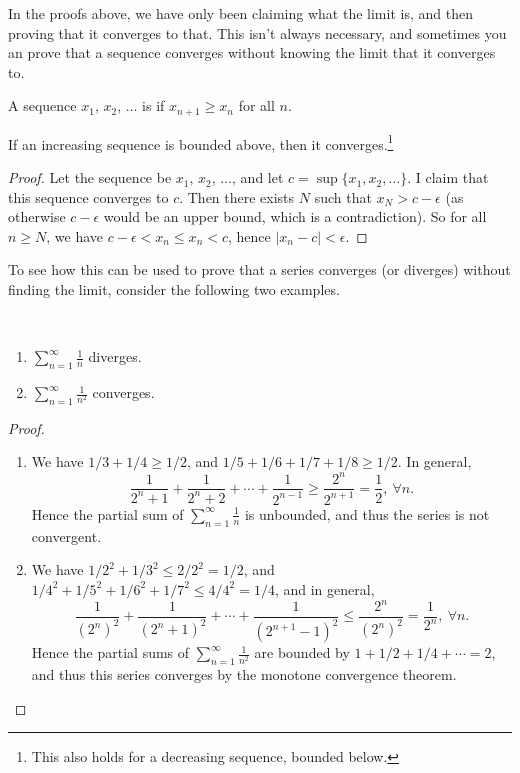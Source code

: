 \documentclass[a4paper]{scrartcl}
\begin{document}
In the proofs above, we have only been claiming what the limit is, and then proving that it converges to that. This isn't always necessary, and sometimes you an prove that a sequence converges without knowing the limit that it converges to.

\begin{definition}
	A sequence $x_1$, $x_2$, $\dots$ is  if $x_{n + 1} \geq x_n$ for all $n$.
\end{definition}

\begin{theorem}
	If an increasing sequence is bounded above, then it converges.\footnote{
		This also holds for a decreasing sequence, bounded below.}
\end{theorem}
\begin{proof}
	Let the sequence be $x_1$, $x_2$, $\dots$, and let $c = \sup \{x_1, x_2, \dots\}$. I claim that this sequence converges to $c$. Then there exists $N$ such that $x_N > c - \epsilon$ (as otherwise $c - \epsilon$ would be an upper bound, which is a contradiction). So for all $n \geq N$, we have $c - \epsilon < x_n \leq x_n < c$, hence $|x_n - c| < \epsilon$.
\end{proof}

To see how this can be used to prove that a series converges (or diverges) without finding the limit, consider the following two examples.
\begin{proposition}~
	    \vspace*{-1.5\baselineskip}
	\begin{enumerate}[label=(\roman*)]
	    \item $\displaystyle \sum_{n = 1}^{\infty} \frac{1}{n}$ diverges.
	    \item $\displaystyle \sum_{n = 1}^{\infty} \frac{1}{n^2}$ converges.
	\end{enumerate}
\end{proposition}
\begin{proof}$ $
\begin{enumerate}[label=(\roman*)]
	\item We have $1/3 + 1/4 \geq 1/2$, and $1/5 + 1/6 + 1/7 + 1/8 \geq 1/2$. In general,
	$$
	\frac{1}{2^n + 1} + \frac{1}{2^n + 2} + \cdots + \frac{1}{2^{n - 1}} \geq \frac{2^n}{2^{n + 1}} = \frac{1}{2},\  \forall n.
	$$
	Hence the partial sum of $\sum_{n = 1}^{\infty} \frac{1}{n}$ is unbounded, and thus the series is not convergent.
	\item We have $1/2^2 + 1/3^2 \leq 2/2^2 = 1/2$, and $1/4^2 + 1/5^2 + 1/6^2 + 1/7^2 \leq 4/4^2 = 1/4$, and in general,
	$$
	\frac{1}{(2^n)^2} + \frac{1}{(2^n + 1)^2} + \cdots + \frac{1}{(2^{n + 1} - 1)^2} \leq \frac{2^n}{(2^n)^2} = \frac{1}{2^n}, \ \forall n.
	$$
	Hence the partial sums of $\sum_{n = 1}^\infty \frac{1}{n^2}$ are bounded by $1 + 1/2 + 1/4 + \cdots = 2$, and thus this series converges by the monotone convergence theorem.
\end{enumerate}
\end{proof}
\end{document}

